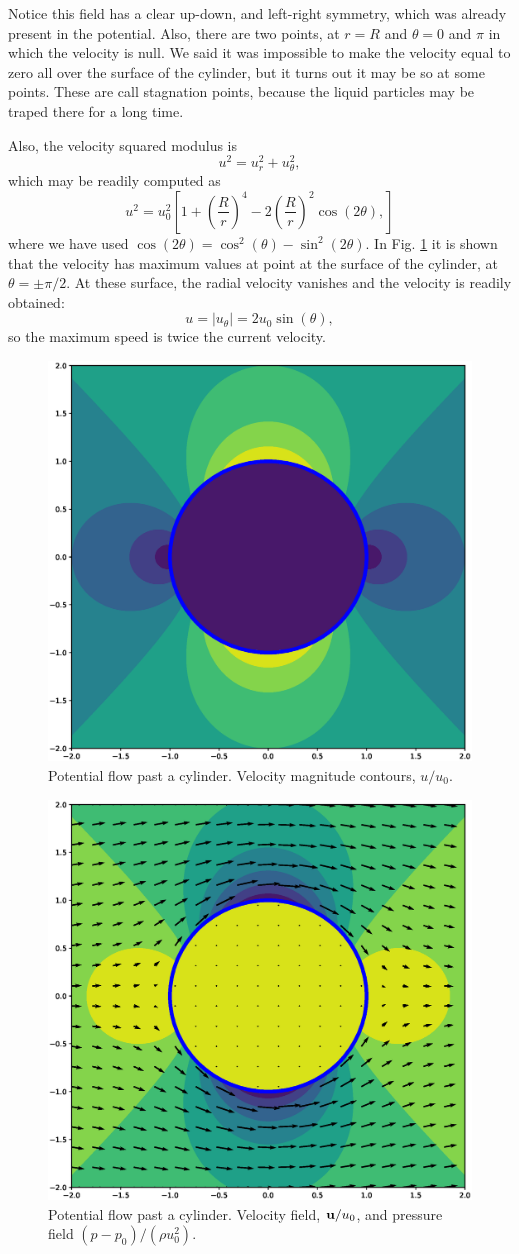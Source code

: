 Notice this field has a clear up-down, and left-right symmetry, which
was already present in the potential. Also, there are two points, at
$r=R$ and $\theta=0$ and $\pi$ in which the velocity is null. We said
it was impossible to make the velocity equal to zero all over the
surface of the cylinder, but it turns out it may be so at some
points. These are call stagnation points, because the liquid particles
may be traped there for a long time.

Also, the velocity squared modulus is
\[
u^2 = u_r^2 + u_\theta^2  ,
\]
which may be readily computed as
\begin{equation}
\label{eq:u2_flow_cylinder}
u^2 = u_0^2 
\left[
 1 + \left( \frac{R}{r}\right)^4 -
 2 \left( \frac{R}{r}\right)^2 \cos(2\theta) ,
\right]
\end{equation}
where we have used $\cos(2\theta) =\cos^2(\theta)  - \sin^2(2\theta) $. In
Fig. \ref{fig:potential_flow_past_cylinder_vel}  it is shown
that the velocity has maximum values at point at the surface of the
cylinder, at $\theta=\pm \pi/2$. At these surface, the radial velocity
vanishes and the velocity is readily obtained:
\[
u = |u_\theta| = 2 u_0  \sin(\theta) ,
\]
so the maximum speed is twice the current velocity.


\begin{figure}
  \centering
  \includegraphics[width=0.4\linewidth]{figures/potential_flow_past_cylinder_vel}
  \caption{
  	Potential flow past a cylinder. Velocity magnitude contours, $u/u_0$.
  	\label{fig:potential_flow_past_cylinder_vel}}
\end{figure}


\begin{figure}
  \centering
  \includegraphics[width=0.4\linewidth]{figures/potential_flow_past_cylinder_vel_p}
  \caption{	Potential flow past a cylinder. Velocity field, $\mathbf{u}/u_0$, and pressure field $ (p-p_0)/(\rho u_0^2)$. \label{fig:potential_flow_past_cylinder_vel_p}}
\end{figure}


